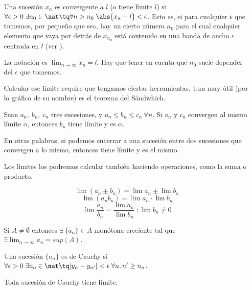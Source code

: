 \documentclass[palatino, nochap]{apuntes}
\begin{document}
\begin{defn}
Una sucesión $x_n$ es convergente a $l$ (o tiene límite $l$) si $\forall \epsilon > 0 \;\exists n_0 \in \nat \tq \forall n > n_0 \;\abs{x_n -l} < \epsilon$. Esto es, si para cualquier ε que tomemos, por pequeño que sea, hay un cierto número $n_0$ para el cual cualquier elemento que vaya por detrás de $x_{n_0}$ está contenido en una banda de ancho $ε$ centrada en $l$ (ver ).

La notación es $\lim_{n\to ∞} x_n = l$. Hay que tener en cuenta que $n_0$ suele depender del $\epsilon$ que tomemos.
\end{defn}

Calcular ese límite require que tengamos ciertas herramientas. Una muy útil (por lo gráfico de su nombre) es el teorema del Sándwhich.

\begin{theorem}
Sean $a_n,\: b_n, \: c_n$ tres sucesiones, y $a_n\leq b_n \leq c_n \:\forall n$. Si $a_n$ y $c_n$ convergen al mismo límite $\alpha$, entonces $b_n$ tiene límite y es $\alpha$.

En otras palabras, si podemos encerrar a una sucesión entre dos sucesiones que convergen a lo mismo, entonces tiene límite y es el mismo.
\end{theorem}

Los límites los podremos calcular también haciendo operaciones, como la suma o producto.

\begin{prop}
\[ \lim (a_n \pm b_n) = \lim a_n \pm \lim b_n \]
\[ \lim (a_n b_n) = \lim a_n \cdot \lim b_n \]
\[ \lim \frac{a_n}{b_n} = \frac{\lim a_n}{\lim b_n} \; ;\lim b_n \neq 0\]
\end{prop}

\begin{lemma}
Si $A\neq \emptyset$ entonces $\exists\: \{a_n\} \in A$ monótona creciente tal que $\exists \lim_{n\to\infty} a_n= sup(A)$.\end{lemma}

\begin{defn}
Una sucesión $\{a_n\}$ es de Cauchy si $\forall \epsilon > 0 \; \exists n_o \in \nat \tq |y_n-y_{n'}| < \epsilon \; \forall n,n' \geq n_o$.\end{defn}

\begin{prop}Toda sucesión de Cauchy tiene límite.\end{prop}
\end{document}
